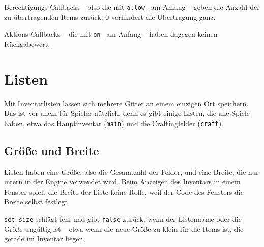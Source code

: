 Berechtigungs-Callbacks -- also die mit \texttt{allow\_\allowbreak{}} am
Anfang -- geben die Anzahl der zu übertragenden Items zurück; 0
verhindert die Übertragung ganz.

Aktions-Callbacks -- die mit \texttt{on\_\allowbreak{}} am Anfang --
haben dagegen keinen Rückgabewert.

\section{Listen}\label{listen}

Mit Inventarlisten lassen sich mehrere Gitter an einem einzigen Ort
speichern. Das ist vor allem für Spieler nützlich, denn es gibt einige
Listen, die alle Spiele haben, etwa das Hauptinventar (\texttt{main})
und die Craftingfelder (\texttt{craft}).

\subsection{Größe und Breite}\label{gruxf6uxdfe-und-breite}

Listen haben eine Größe, also die Gesamtzahl der Felder, und eine
Breite, die nur intern in der Engine verwendet wird. Beim Anzeigen des
Inventars in einem Fenster spielt die Breite der Liste keine Rolle, weil
der Code des Fensters die Breite selbst festlegt.

\begin{Shaded}
\begin{Highlighting}[]
 \OperatorTok{:}\OperatorTok{(}\OperatorTok{,} \OperatorTok{)} 
    \OperatorTok{:}\OperatorTok{(}\OperatorTok{,} \OperatorTok{)}
    \OperatorTok{(}  \OperatorTok{:}\OperatorTok{(}\OperatorTok{))}
    \OperatorTok{(}  \OperatorTok{:}\OperatorTok{(}\OperatorTok{))}
    \OperatorTok{(}\OperatorTok{)}
\end{Highlighting}
\end{Shaded}

\texttt{set\_\allowbreak{}size} schlägt fehl und gibt \texttt{false}
zurück, wenn der Listenname oder die Größe ungültig ist -- etwa wenn die
neue Größe zu klein für die Items ist, die gerade im Inventar liegen.

